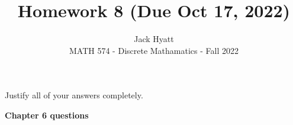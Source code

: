 \documentclass[12pt]{article}
\begin{document}
	
	
	
	\title{Homework 8 (Due Oct 17, 2022)}
	\author{Jack Hyatt\\ %
		MATH 574 - Discrete Mathamatics - Fall 2022} 
	
	\maketitle
	
	Justify all of your answers completely.\\
	
	\renewcommand{\qedsymbol}{$\blacksquare$}

{\bf Chapter 6 questions}
\end{document}
